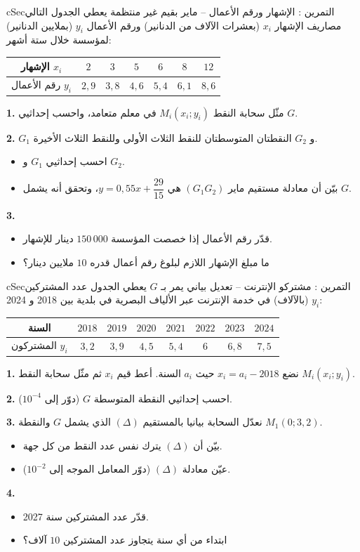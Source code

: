 \documentclass[12pt,a4paper]{article}
\newenvironment{BOX}[2]{\begin{otherlanguage}{english}\begin{arbox}{#1}{#2}}{\end{arbox}\end{otherlanguage}}
\newcounter{exo}
\newenvironment{tamrin}[1]{\stepcounter{exo}\begin{BOX}{cSec}{التمرين \theexo: #1}}{\end{BOX}}
\newenvironment{LTR}{\begin{otherlanguage}{english}}{\end{otherlanguage}}
\newcommand{\ar}[1]{\foreignlanguage{arabic}{#1}}
\newenvironment{sq}{\begin{itemize}[leftmargin=2.4em,itemsep=3pt]}{\end{itemize}}
\newcommand{\qa}{\item[(أ)]}\newcommand{\qb}{\item[(ب)]}\newcommand{\qc}{\item[(جـ)]}\newcommand{\qd}{\item[(د)]}\newcommand{\qe}{\item[(هـ)]}
\newcommand{\QQ}[1]{\par\smallskip\textbf{#1.} }
\begin{document}
\begin{tamrin}{الإشهار ورقم الأعمال -- ماير بقيم غير منتظمة}
يعطي الجدول التالي مصاريف الإشهار $x_i$ (بعشرات الآلاف من الدنانير) ورقم الأعمال $y_i$ (بملايين الدنانير) لمؤسسة خلال ستة أشهر:
\begin{center}\begin{LTR}\renewcommand{\arraystretch}{1.35}\small
\begin{tabular}{|c|c|c|c|c|c|c|}\hline
\rowcolor{cSec!12}\ar{الإشهار} $x_i$ & $2$ & $3$ & $5$ & $6$ & $8$ & $12$\\\hline
\ar{رقم الأعمال} $y_i$ & $2,9$ & $3,8$ & $4,6$ & $5,4$ & $6,1$ & $8,6$\\\hline
\end{tabular}\end{LTR}\end{center}
\QQ{1} مثّل سحابة النقط $M_i(x_i;y_i)$ في معلم متعامد، واحسب إحداثيي $G$.
\QQ{2} $G_1$ و $G_2$ النقطتان المتوسطتان للنقط الثلاث الأولى وللنقط الثلاث الأخيرة.
\begin{sq}
\qa احسب إحداثيي $G_1$ و $G_2$.
\qb بيّن أن معادلة مستقيم ماير $(G_1G_2)$ هي $y=0{,}55x+\dfrac{29}{15}$، وتحقق أنه يشمل $G$.
\end{sq}
\QQ{3}
\begin{sq}
\qa قدّر رقم الأعمال إذا خصصت المؤسسة $150\,000$ دينار للإشهار.
\qb ما مبلغ الإشهار اللازم لبلوغ رقم أعمال قدره $10$ ملايين دينار؟
\end{sq}
\end{tamrin}

\begin{tamrin}{مشتركو الإنترنت -- تعديل بياني يمر بـ $G$}
يعطي الجدول عدد المشتركين $y_i$ (بالآلاف) في خدمة الإنترنت عبر الألياف البصرية في بلدية بين 2018 و 2024:
\begin{center}\begin{LTR}\renewcommand{\arraystretch}{1.35}\small
\begin{tabular}{|c|c|c|c|c|c|c|c|}\hline
\rowcolor{cSec!12}\ar{السنة} & $2018$ & $2019$ & $2020$ & $2021$ & $2022$ & $2023$ & $2024$\\\hline
\ar{المشتركون} $y_i$ & $3,2$ & $3,9$ & $4,5$ & $5,4$ & $6$ & $6,8$ & $7,5$\\\hline
\end{tabular}\end{LTR}\end{center}
\QQ{1} نضع $x_i=a_i-2018$ حيث $a_i$ السنة. أعط قيم $x_i$ ثم مثّل سحابة النقط $M_i(x_i;y_i)$.
\QQ{2} احسب إحداثيي النقطة المتوسطة $G$ (دوّر إلى $10^{-4}$).
\QQ{3} نعدّل السحابة بيانيا بالمستقيم $(\Delta)$ الذي يشمل $G$ والنقطة $M_1(0;3{,}2)$.
\begin{sq}
\qa بيّن أن $(\Delta)$ يترك نفس عدد النقط من كل جهة.
\qb عيّن معادلة $(\Delta)$ (دوّر المعامل الموجه إلى $10^{-2}$).
\end{sq}
\QQ{4}
\begin{sq}
\qa قدّر عدد المشتركين سنة 2027.
\qb ابتداء من أي سنة يتجاوز عدد المشتركين $10$ آلاف؟
\end{sq}
\end{tamrin}
\end{document}
